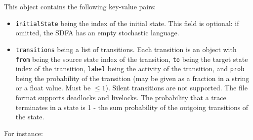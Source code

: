 {    This object contains the following key-value pairs:
    \begin{itemize}
    \item \texttt{initialState} being the index of the initial state. This field is optional: if omitted, the SDFA has an empty stochastic language.
    \item \texttt{transitions} being a list of transitions. 
    Each transition is an object with \texttt{from} being the source state index of the transition, 
    \texttt{to} being the target state index of the transition, 
    \texttt{label} being the activity of the transition, and
    \texttt{prob} being the probability of the transition (may be given as a fraction in a string or a float value. Must be $\leq 1$). 
    Silent transitions are not supported.
    The file format supports deadlocks and livelocks.
    The probability that a trace terminates in a state is 1 - the sum probability of the outgoing transitions of the state.
    \end{itemize}
    For instance:
    
\clearpage
}
